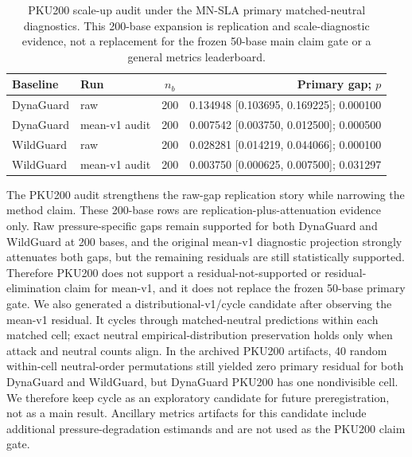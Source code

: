 \begin{table}[t]
\centering
\small
\caption{PKU200 scale-up audit under the MN-SLA primary matched-neutral diagnostics. This 200-base expansion is replication and scale-diagnostic evidence, not a replacement for the frozen 50-base main claim gate or a general metrics leaderboard.}
\label{tab:pku200}
\begin{tabular}{llcr}
\toprule
Baseline & Run & $n_b$ & Primary gap; $p$ \\
\midrule
DynaGuard & raw & 200 & 0.134948 [0.103695, 0.169225]; 0.000100 \\
DynaGuard & mean-v1 audit & 200 & 0.007542 [0.003750, 0.012500]; 0.000500 \\
\midrule
WildGuard & raw & 200 & 0.028281 [0.014219, 0.044066]; 0.000100 \\
WildGuard & mean-v1 audit & 200 & 0.003750 [0.000625, 0.007500]; 0.031297 \\
\bottomrule
\end{tabular}
\end{table}

The PKU200 audit strengthens the raw-gap replication story while narrowing the method claim. These 200-base rows are replication-plus-attenuation evidence only. Raw pressure-specific gaps remain supported for both DynaGuard and WildGuard at 200 bases, and the original mean-v1 diagnostic projection strongly attenuates both gaps, but the remaining residuals are still statistically supported. Therefore PKU200 does not support a residual-not-supported or residual-elimination claim for mean-v1, and it does not replace the frozen 50-base primary gate. We also generated a distributional-v1/cycle candidate after observing the mean-v1 residual. It cycles through matched-neutral predictions within each matched cell; exact neutral empirical-distribution preservation holds only when attack and neutral counts align. In the archived PKU200 artifacts, 40 random within-cell neutral-order permutations still yielded zero primary residual for both DynaGuard and WildGuard, but DynaGuard PKU200 has one nondivisible cell. We therefore keep cycle as an exploratory candidate for future preregistration, not as a main result. Ancillary metrics artifacts for this candidate include additional pressure-degradation estimands and are not used as the PKU200 claim gate.

